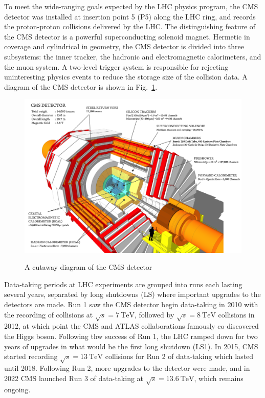 

To meet the wide-ranging goals expected by the LHC physics program, the CMS detector \cite{CMSTDR} was installed at insertion point 5 (P5) along the LHC ring, and records the proton-proton collisions delivered by the LHC. The distinguishing feature of the CMS detector is a powerful superconducting solenoid magnet. Hermetic in coverage and cylindrical in geometry, the CMS detector is divided into three subsystems: the inner tracker, the hadronic and electromagnetic calorimeters, and the muon system. A two-level trigger system is responsible for rejecting uninteresting physics events to reduce the storage size of the collision data. A diagram of the CMS detector is shown in Fig.~\ref{fig:CMSDiagram}.

\begin{figure}[H]
    \centering
    {\includegraphics[width=1\textwidth]{Images/CMS/CMSDiagram.png}}
    \caption{A cutaway diagram of the CMS detector}
    \label{fig:CMSDiagram}
\end{figure}

Data-taking periods at LHC experiments are grouped into runs each lasting several years, separated by long shutdowns (LS) where important upgrades to the detectors are made. Run 1 saw the CMS detector begin data-taking in 2010 with the recording of collisions at $\sqrt{s}=\SI{7}{\TeV}$, followed by $\sqrt{s}=\SI{8}{\TeV}$ collisions in 2012, at which point the CMS and ATLAS collaborations famously co-discovered the Higgs boson. Following thw success of Run 1, the LHC ramped down for two years of upgrades in what would be the first long shutdown (LS1). In 2015, CMS started recording $\sqrt{s}=\SI{13}{\TeV}$ collisions for Run 2 of data-taking which lasted until 2018. Following Run 2, more upgrades to the detector were made, and in 2022 CMS launched Run 3 of data-taking at $\sqrt{s}=\SI{13.6}{\TeV}$, which remains ongoing.



